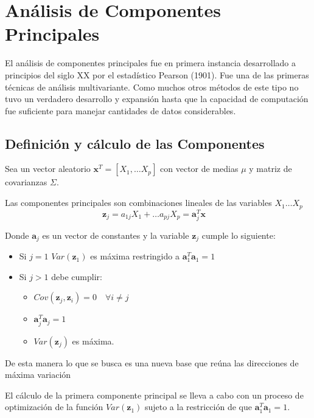 \section{Análisis de Componentes Principales}
%
\noindent El análisis de componentes principales fue en primera instancia desarrollado a principios del siglo XX por el estadístico Pearson (1901). Fue una de las primeras técnicas de análisis multivariante. Como muchos otros métodos de este tipo no tuvo un verdadero desarrollo y expansión hasta que la capacidad de computación fue suficiente para manejar cantidades de datos considerables. 

\subsection{Definición y cálculo de las Componentes}

\noindent Sea un vector aleatorio $\textbf{x}^T=[X_1,\ldots X_p]$ con vector de medias $\mu$ y matriz de covarianzas $\Sigma$.
\begin{defi}
Las componentes principales son combinaciones lineales de las variables $X_1 \ldots X_p$
\begin{equation}
\textbf{z}_j=a_{1j}X_1+\ldots a_{pj}X_p=\textbf{a}_j^T\textbf{x}\quad 
\end{equation}

\noindent Donde $\textbf{a}_j$ es un vector de constantes y la variable $\textbf{z}_j$ cumple lo siguiente:
\begin{itemize}
\item Si $j=1$ $Var(\textbf{z}_1)$ es máxima restringido a $\textbf{a}_1^T \textbf{a}_1=1$
\item Si $j>1$ debe cumplir:
\begin{itemize}
\item $Cov(\textbf{z}_j,\textbf{z}_i)=0\quad \forall i\neq j $
\item $\textbf{a}_j^T \textbf{a}_j=1$
\item $Var(\textbf{z}_j)$ es máxima. 
\end{itemize}
\end{itemize}
\noindent De esta manera lo que se busca es una nueva base que reúna las direcciones de máxima variación 
\end{defi}

\noindent El cálculo de la primera componente principal se lleva a cabo con un proceso de optimización de la función $Var(\textbf{z}_1)$ sujeto a la restricción de que $\textbf{a}_1^T\textbf{a}_1=1$. 

